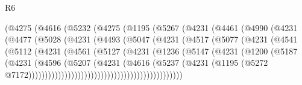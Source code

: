 \begin{lexlean}{R6}
\begin{coremodule}
                    (@4275
                      (@4616
                        (@5232
                          (@4275
                            (@1195
                              (@5267
                                (@4231
                                  (@4461
                                    (@4990
                                      (@4231
                                        (@4477
                                          (@5028
                                            (@4231
                                              (@4493
                                                (@5047
                                                  (@4231
                                                    (@4517
                                                      (@5077
                                                        (@4231
                                                          (@4541
                                                            (@5112
                                                              (@4231
                                                                (@4561
                                                                  (@5127
                                                                    (@4231
                                                                      (@1236
                                                                        (@5147
                                                                          (@4231
                                                                            (@1200
                                                                              (@5187
                                                                                (@4231
                                                                                  (@4596
                                                                                    (@5207
                                                                                      (@4231
                                                                                        (@4616
                                                                                          (@5237
                                                                                            (@4231
                                                                                              (@1195
                                                                                                (@5272
                                                                                                  @7172)))))))))))))))))))))))))))))))))))))))))))))))

\end{coremodule}
\end{lexlean}
